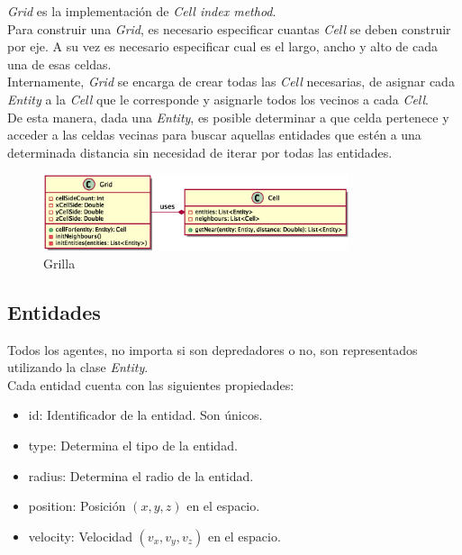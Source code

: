 \documentclass[a4paper]{article}
\begin{document}
            \textit{Grid} es la implementación de \textit{Cell index method}. \\
            Para construir una \textit{Grid}, es necesario especificar cuantas \textit{Cell} se deben construir por eje. A su vez es necesario especificar cual es el largo, ancho y alto de cada una de esas celdas. \\
            Internamente, \textit{Grid} se encarga de crear todas las \textit{Cell} necesarias, de asignar cada \textit{Entity} a la \textit{Cell} que le corresponde y asignarle todos los vecinos a cada \textit{Cell}. \\
            De esta manera, dada una \textit{Entity}, es posible determinar a que celda pertenece y acceder a las celdas vecinas para buscar aquellas entidades que estén a una determinada distancia sin necesidad de iterar por todas las entidades.

            \begin{figure}[H]
                \centering
                \includegraphics[width=0.8\textwidth]{../imgs/grid}
                \caption{Grilla}
                \label{fig:grid_implementation}
            \end{figure}

        \subsection{Entidades}

            Todos los agentes, no importa si son depredadores o no, son representados utilizando la clase \textit{Entity}. \\
            Cada entidad cuenta con las siguientes propiedades:
            \begin{itemize}
                \item id: Identificador de la entidad. Son únicos.
                \item type: Determina el tipo de la entidad.
                \item radius: Determina el radio de la entidad.
                \item position: Posición $(x, y, z)$ en el espacio.
                \item velocity: Velocidad $(v_x, v_y, v_z)$ en el espacio.
            \end{itemize}
\end{document}
